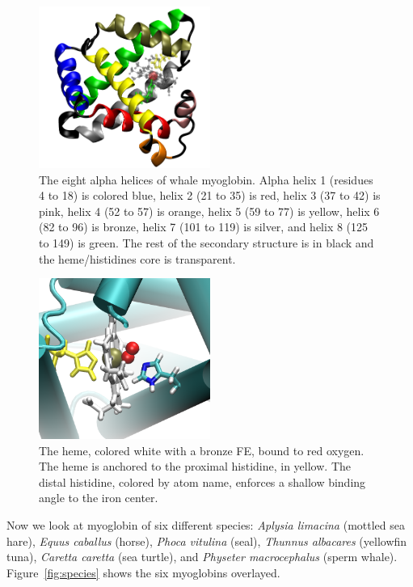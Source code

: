 \documentclass{article}
\begin{document}
\begin{figure}
	\centering
	\includegraphics[width=0.5\textwidth]{alpha_helices.png}
	\caption{The eight alpha helices of whale myoglobin.  Alpha helix 1 (residues 4 to 18) is colored blue, helix 2 (21 to 35) is red, helix 3 (37 to 42) is pink, helix 4 (52 to 57) is orange, helix 5 (59 to 77) is yellow, helix 6 (82 to 96) is bronze, helix 7 (101 to 119) is silver, and helix 8 (125 to 149) is green.  The rest of the secondary structure is in black and the heme/histidines core is transparent.}
	\label{fig:alpha_helices}
\end{figure}

\begin{figure}
	\centering
	\includegraphics[width=0.5\textwidth]{histidines.png}
	\caption{The heme, colored white with a bronze FE, bound to red oxygen.  The heme is anchored to the proximal histidine, in yellow.  The distal histidine, colored by atom name, enforces a shallow binding angle to the iron center.}
	\label{fig:histidines}
\end{figure}

Now we look at myoglobin of six different species: \textit{Aplysia limacina} (mottled sea hare), \textit{Equus caballus} (horse), \textit{Phoca vitulina} (seal), \textit{Thunnus albacares} (yellowfin tuna), \textit{Caretta caretta} (sea turtle), and \textit{Physeter macrocephalus} (sperm whale).  Figure~\ref{fig:species} shows the six myoglobins overlayed.
\end{document}
